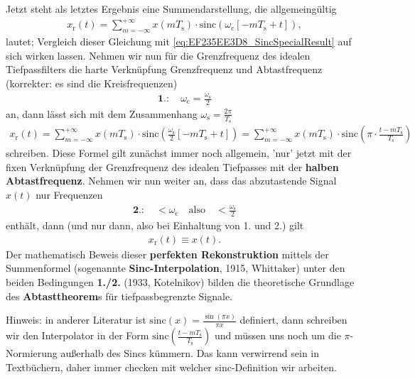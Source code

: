 \begin{mdframed}
Jetzt steht als letztes Ergebnis eine Summendarstellung, die allgemeingültig
\begin{align}
x_\mathrm{r}(t)
= \sum_{m=-\infty}^{+\infty} x(m T_\mathrm{s}) \cdot \mathrm{sinc}(\omega_\mathrm{c} [-m T_\mathrm{s} + t]),
\end{align}
lautet; Vergleich dieser Gleichung mit \eqref{eq:EF235EE3D8_SincSpecialResult} auf sich wirken lassen.
Nehmen wir nun für die Grenzfrequenz des idealen Tiefpassfilters die harte Verknüpfung Grenzfrequenz und Abtastfrequenz (korrekter: es sind die Kreisfrequenzen)
\begin{align}
\textbf{1.}:\quad\omega_\mathrm{c} = \frac{\omega_\mathrm{s}}{2}
\end{align}
an, dann lässt sich mit dem Zusammenhang
$\omega_\mathrm{s} = \frac{2\pi}{T_\mathrm{s}}$
\begin{align}
\label{eq:EF235EE3D8:ZeitSincInterpolation}
x_\mathrm{r}(t)=
\sum_{m=-\infty}^{+\infty} x(m T_\mathrm{s}) \cdot \mathrm{sinc}(\frac{\omega_\mathrm{s}}{2} [-m T_\mathrm{s} + t])=
\sum_{m=-\infty}^{+\infty} x(m T_\mathrm{s}) \cdot \mathrm{sinc}\left(\pi \cdot \frac{t-m T_\mathrm{s}}{T_\mathrm{s}}\right)
\end{align}
schreiben. Diese Formel gilt zunächst immer noch allgemein, 'nur' jetzt mit der
fixen Verknüpfung der Grenzfrequenz des idealen Tiefpasses mit der \textbf{halben Abtastfrequenz}.
Nehmen wir nun weiter an, dass das abzutastende Signal $x(t)$ nur Frequenzen
\begin{align}
\textbf{2.}:\quad<\omega_\mathrm{c}\quad\text{also}\quad<\frac{\omega_\mathrm{s}}{2}
\end{align}
enthält, dann (und nur dann, also bei Einhaltung von 1. und 2.) gilt
\begin{align}
x_\mathrm{r}(t) \equiv x(t).
\end{align}
Der mathematisch Beweis dieser \textbf{perfekten Rekonstruktion}
mittels der Summenformel (sogenannte \textbf{Sinc-Interpolation}, 1915, Whittaker)
unter den beiden Bedingungen \textbf{1./2.} (1933, Kotelnikov) bilden die theoretische
Grundlage des \textbf{Abtasttheorem}s für tiefpassbegrenzte Signale.
%

Hinweis: in anderer Literatur ist $\mathrm{sinc}(x)=\frac{\sin(\pi x)}{\pi x}$ definiert,
dann schreiben wir den Interpolator in der Form
$\mathrm{sinc}\left(\frac{t-m T_\mathrm{s}}{T_\mathrm{s}}\right)$ und müssen uns
noch um die $\pi$-Normierung außerhalb des Sincs kümmern. Das kann verwirrend sein
in Textbüchern, daher immer checken mit welcher sinc-Definition wir arbeiten.
\end{mdframed}


